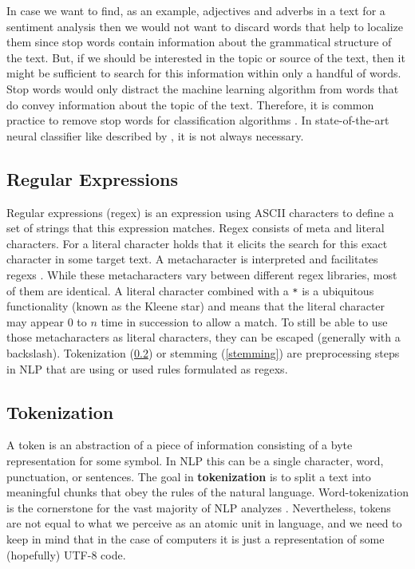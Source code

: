   In case we want to find, as an example, adjectives and adverbs in a text for a sentiment analysis then we would not want to discard words that help to localize them since stop words contain information about the grammatical structure of the text.
  But, if we should be interested in the topic or source of the text, then it might be sufficient to search for this information within only a handful of words.
  Stop words would only distract the machine learning algorithm from words that do convey information about the topic of the text.
  Therefore, it is common practice to remove stop words for classification algorithms \citep{McCallum1998, Lodhi2002, Tong2001}.
  In state-of-the-art neural classifier like described by \cite{Howard2018}, it is not always necessary.

\subsection{Regular Expressions}
  Regular expressions (\gls{regex}) is an expression using ASCII characters to define a set of strings that this expression matches.
  Regex consists of meta and literal characters.
  For a literal character holds that it elicits the search for this exact character in some target text.
  A metacharacter is interpreted and facilitates regexs \citep{Kleene1951}.
  While these metacharacters vary between different regex libraries, most of them are identical.
  A literal character combined with a \texttt{*} is a ubiquitous functionality (known as the Kleene star) and means that the literal character may appear $0$ to $n$ time in succession to allow a match.
  To still be able to use those metacharacters as literal characters, they can be escaped (generally with a backslash).
  Tokenization (\ref{tokenization}) or stemming (\ref{stemming}) are preprocessing steps in NLP that are using or used rules formulated as regexs.

\subsection{Tokenization}\label{tokenization}
  A token is an abstraction of a piece of information consisting of a byte representation for some symbol.
  In NLP this can be a single character, word, punctuation, or sentences.
  The goal in \textbf{tokenization} is to split a text into meaningful chunks that obey the rules of the natural language.
  Word-tokenization is the cornerstone for the vast majority of NLP analyzes \citep{Webster1992}.
  Nevertheless, tokens are not equal to what we perceive as an atomic unit in language, and we need to keep in mind that in the case of computers it is just a representation of some (hopefully) UTF-8 code.

